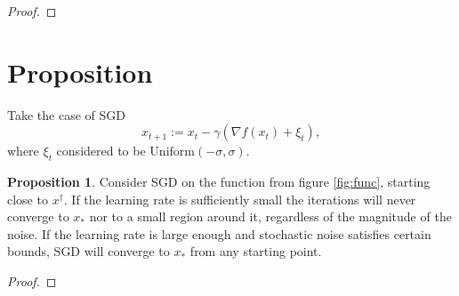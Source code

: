 \documentclass{article}
\theoremstyle{definition}
\newtheorem{proposition}[theorem]{Proposition}
\begin{document}
\begin{proof}
    
\end{proof}

\section*{Proposition}
Take the case of SGD 
$$ 
x_{t + 1} := x_t - \gamma \left( 
    \nabla f(x_t) + \xi_t
\right),
$$
where $\xi_t$ considered to be $\mathrm{Uniform}(-\sigma, \sigma)$.

\begin{proposition}
    Consider SGD on the function from figure \ref{fig:func}, 
    starting close to $x^\dagger$.
    If the learning rate is sufficiently small the iterations
    will never converge to $x_\ast$ nor to a small region around it, 
    regardless of the magnitude of the noise. 
    If the learning rate is large enough and stochastic noise
    satisfies certain bounds, SGD will converge to $x_\ast$ 
    from any starting point.
\end{proposition}

\begin{proof}
    
\end{proof}



\end{document}
